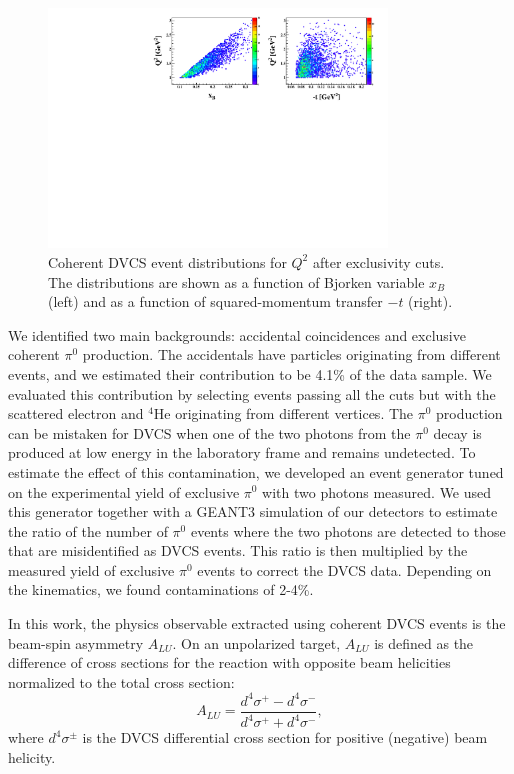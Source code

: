 \documentclass[twocolumn,nofootinbib,prl,superscriptaddress,secnumarabic,amssymb,nobibnotes,aps,floatfix]{revtex4}
\begin{document}
\begin{figure}[tb]
\hspace{-0.45cm}
\includegraphics[width=9cm]{F_Q2_xB_t_Coh.pdf}
\caption{Coherent DVCS event distributions for $Q^2$ after exclusivity cuts. 
The distributions are shown as a function of Bjorken variable $x_B$ (left) 
and as a function of squared-momentum transfer $-t$ (right).}
\label{fig:kin-coverage}
\end{figure}

We identified two main backgrounds: accidental coincidences and exclusive 
coherent $\pi^0$ production. The accidentals have particles originating from 
different events, and we estimated their contribution to be 4.1\% of the data 
sample. We evaluated this contribution by selecting events passing all the cuts 
but with the scattered electron and $^4$He originating from different vertices.  
The $\pi^0$ production can be mistaken for DVCS when one of the two photons 
from the $\pi^0$ decay is produced at low energy in the laboratory frame and 
remains undetected.  To estimate the effect of this contamination, we developed 
an event generator tuned on the experimental yield of exclusive $\pi^0$ with 
two photons measured.  We used this generator together with a GEANT3 simulation 
of our detectors to estimate the ratio of the number of $\pi^0$ events where 
the two photons are detected to those that are misidentified as DVCS events.  
This ratio is then multiplied by the measured yield of exclusive $\pi^0$ events 
to correct the DVCS data. Depending on the kinematics, we found contaminations 
of 2-4\%. 

In this work, the physics observable extracted using coherent DVCS events is
the beam-spin asymmetry $A_{LU}$. On an unpolarized target, $A_{LU}$ is defined 
as the difference of cross sections for the reaction with opposite beam 
helicities normalized to the total cross section:
  \begin{equation}
  A_{LU} = \frac{d^{4}\sigma^{+} - d^{4}\sigma^{-} }
                {d^{4}\sigma^{+} + d^{4}\sigma^{-}},
    \label{BSA_equation}
  \end{equation}
where $d^{4}\sigma^{\pm}$ is the DVCS differential cross section for positive 
(negative) beam helicity. 
\end{document}
